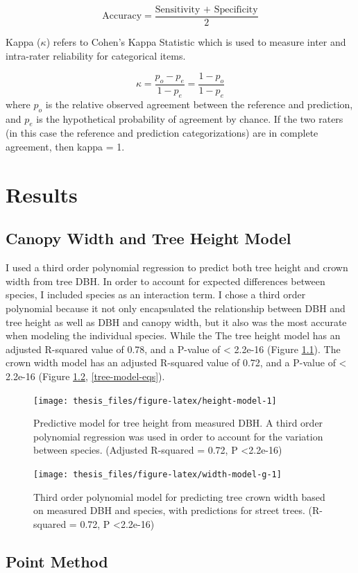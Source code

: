 \documentclass[12pt,twoside]{reedthesis}
\begin{document}
\[
\textrm{Accuracy}= \frac{\textrm{Sensitivity + Specificity}}{2}
\]

Kappa (\(\kappa\)) refers to Cohen's Kappa Statistic which is used to measure inter and intra-rater reliability for categorical items.

\[
\kappa = \frac{p_o - p_e}{1 - p_e} = \frac{1 - p_o}{1 - p_e}
\]
where \(p_o\) is the relative observed agreement between the reference and prediction, and \(p_e\) is the hypothetical probability of agreement by chance. If the two raters (in this case the reference and prediction categorizations) are in complete agreement, then kappa = 1.

\hypertarget{results}{%
\chapter{Results}\label{results}}

\hypertarget{canopy-width-and-tree-height-model-1}{%
\section{Canopy Width and Tree Height Model}\label{canopy-width-and-tree-height-model-1}}

I used a third order polynomial regression to predict both tree height and crown width from tree DBH. In order to account for expected differences between species, I included species as an interaction term. I chose a third order polynomial because it not only encapsulated the relationship between DBH and tree height as well as DBH and canopy width, but it also was the most accurate when modeling the individual species. While the
The tree height model has an adjusted R-squared value of 0.78, and a P-value of \textless{} 2.2e-16 (Figure \ref{fig:height-model}). The crown width model has an adjusted R-squared value of 0.72, and a P-value of \textless{} 2.2e-16 (Figure \ref{fig:width-model-g}, \ref{tree-model-eqs}).
\begin{figure}
\texttt{[image: thesis\_files/figure-latex/height-model-1]} \caption[Tree height predictive model]{Predictive model for tree height from measured DBH. A third order polynomial regression was used in order to account for the variation between species. (Adjusted R-squared = 0.72, P <2.2e-16)}\label{fig:height-model}
\end{figure}
\begin{figure}
\texttt{[image: thesis\_files/figure-latex/width-model-g-1]} \caption[Crown width predictive model]{Third order polynomial model for predicting tree crown width based on measured DBH and species, with predictions for street trees. (R-squared = 0.72,  P <2.2e-16)}\label{fig:width-model-g}
\end{figure}
\hypertarget{point-method-1}{%
\section{Point Method}\label{point-method-1}}
\end{document}
